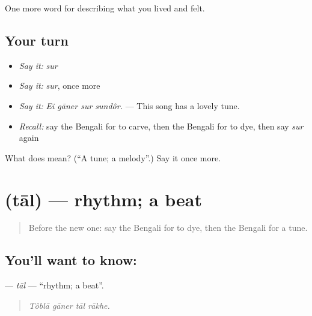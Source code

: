 \begin{grammarlens}[title={What you've built}]
One more word for describing what you lived and felt.
\end{grammarlens}

\subsection*{Your turn}
\begin{itemize}
\raggedright
  \item \emph{Say it:} \emph{sur}
  \item \emph{Say it:} \emph{sur}, once more
  \item \emph{Say it:} \emph{Ei gāner sur sundôr.} — This song has a lovely tune.
  \item \emph{Recall:} say the Bengali for to carve, then the Bengali for to dye, then say \emph{sur} again
\end{itemize}

\begin{tcolorbox}[breakable,colback=teal!4,colframe=teal!35!black,title={Before you move on}]
What does  mean? (\textquotedblleft{}A tune; a melody\textquotedblright{}.) Say it once more.
\end{tcolorbox}
\section[\texorpdfstring{\bn{তাল} (tāl)}{তাল (tāl)}]{ (tāl) — rhythm; a beat}

\label{lesson:BN-C525-tal}



\begin{quote}
Before the new one: say the Bengali for to dye, then the Bengali for a tune.
\end{quote}

\subsection*{You'll want to know: }
\textbf{} — \emph{tāl} — \textquotedblleft{}rhythm; a beat\textquotedblright{}.

\begin{quote}
   
\end{quote}

\begin{quote}
\emph{Tôblā gāner tāl rākhe.}
\end{quote}

